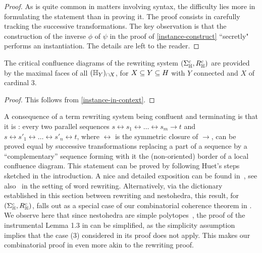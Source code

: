 \begin{proof}
As is quite common in matters involving syntax, the difficulty lies more in formulating the statement than in proving it. The proof consists in carefully tracking the successive transformations. 
The key observation is that the construction of the inverse $\phi$ of $\psi$ in the proof of \cref{instance-construct} ``secretly" performs an instantiation. 
The details are left to the reader.
\end{proof}


\begin{proposition}
\label{critical-pairs-nestohedra}
The critical confluence diagrams of the rewriting system $(\Sigma_{\mathbb H}^c,R_{\mathbb H}^c)$  are provided by the maximal  faces of all $({\mathbb H}_Y)_{\cap X}$, for $X\subseteq Y \subseteq H$ with $Y$ connected and $X$ of cardinal 3.
\end{proposition}
\begin{proof}
This follows from \cref{instance-in-context}.
\end{proof}

\begin{rem}
  \label{rem:coherence}
A consequence of a term rewriting system  being confluent and terminating is that it is :
every two parallel  sequences
 $s\leftrightarrow s_1 \leftrightarrow \ldots \leftrightarrow s_m\to t$ and $s\leftrightarrow s'_1 \leftrightarrow \ldots \leftrightarrow s'_n\leftrightarrow t$, where $\leftrightarrow$ is the symmetric closure of $\to$,  can be proved equal by successive transformations replacing a part of a  sequence by a ``complementary''  sequence forming with it the (non-oriented) border of a local confluence diagram. 
 This statement can be proved by following Huet's steps sketched in the introduction.  
 A nice and detailed exposition can be found in~\cite{Beke-Knuth}, see also~\cite{GM-FDT} in the 
 setting of word rewriting.
 Alternatively, via the dictionary  established in this section between rewriting and nestohedra, this result, for $(\Sigma_{\mathbb H}^c ,R_{\mathbb H}^c)$, falls out as a special case of our combinatorial coherence theorem in \cite[Thm~1.4 \& Prop.~1.7]{CLA1}. 
 We observe here that since nestohedra are simple polytopes~\cite[Sec.~9]{DP-HP}, the proof of the instrumental Lemma 1.3 in \cite{CLA1} can be simplified, as the simplicity assumption implies that the case (3) considered in its proof does not apply. 
 This makes our combinatorial proof in \cite{CLA1} even more akin to the rewriting proof.
 \end{rem}


